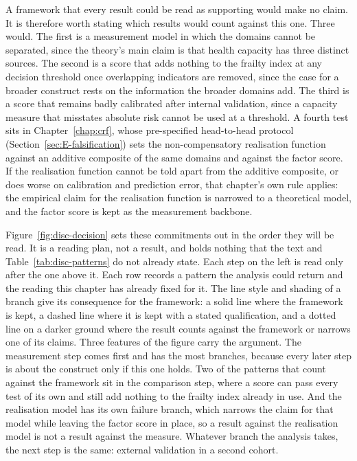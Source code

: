 A framework that every result could be read as supporting would make no claim. It
is therefore worth stating which results would count against this one. Three would.
The first is a measurement model in which the domains cannot be separated, since
the theory's main claim is that health capacity has three distinct sources. The
second is a score that adds nothing to the frailty index at any decision threshold
once overlapping indicators are removed, since the case for a broader construct
rests on the information the broader domains add. The third is a score that remains
badly calibrated after internal validation, since a capacity measure that misstates
absolute risk cannot be used at a threshold. A fourth test sits in
Chapter~\ref{chap:crf}, whose pre-specified head-to-head protocol
(Section~\ref{sec:E-falsification}) sets the non-compensatory realisation function
against an additive composite of the same domains and against the factor score. If
the realisation function cannot be told apart from the additive composite, or does
worse on calibration and prediction error, that chapter's own rule applies: the
empirical claim for the realisation function is narrowed to a theoretical model, and
the factor score is kept as the measurement backbone.

Figure~\ref{fig:disc-decision} sets these commitments out in the order they will
be read. It is a reading plan, not a result, and holds nothing that the text and
Table~\ref{tab:disc-patterns} do not already state. Each step on the left is read
only after the one above it. Each row records a pattern the analysis could
return and the reading this chapter has already fixed for it. The line style and
shading of a branch give its consequence for the framework: a solid line where the
framework is kept, a dashed line where it is kept with a stated qualification, and
a dotted line on a darker ground where the result counts against the framework or
narrows one of its claims. Three features of the figure carry the argument. The
measurement step comes first and has the most branches, because every later step
is about the construct only if this one holds. Two of the patterns that count
against the framework sit in the comparison step, where a score can pass every
test of its own and still add nothing to the frailty index already in use. And
the realisation model has its own failure branch, which narrows the claim for that
model while leaving the factor score in place, so a result against the
realisation model is not a result against the measure. Whatever branch the
analysis takes, the next step is the same: external validation in a second
cohort.

